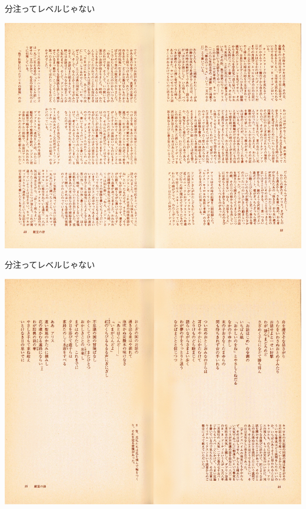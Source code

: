 \documentclass[14pt,dvipdfmx,uplatex]{beamer}
\begin{document}
\begin{frame}[t]{\inhibitglue 分注ってレベルじゃない}
  \sffamily
  \begin{center}
    \includegraphics[width=.8\textwidth]{alice1.png}
  \end{center}
\end{frame}

\begin{frame}[t]{\inhibitglue 分注ってレベルじゃない}
  \sffamily
  \begin{center}
    \includegraphics[width=.8\textwidth]{alice2.png}
  \end{center}
\end{frame}
\end{document}
